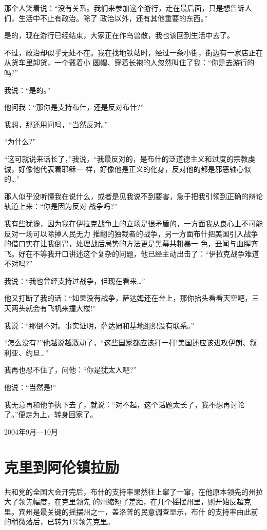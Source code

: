 ﻿\documentclass[11pt]{article}
\begin{document}
那个人笑着说：``没有关系。我们来参加这个游行，走在最后面，只是想告诉人们，生活中不止有政治。除了
政治以外，还有其他重要的东西。''


是的，现在游行已经结束，大家正在作鸟兽散，我也该回到生活中去了。

不过，政治却似乎无处不在。我在找地铁站时，经过一条小街，街边有一家店正在从货车里卸货，一个戴着小
圆帽、穿着长袍的人忽然叫住了我：``你是去游行的吗?''

我说：``是的。''

他问我：``那你是支持布什，还是反对布什?''

我想，那还用问吗，``当然反对。''

``为什么?''

``这可就说来话长了，''我说，``我最反对的，是布什的泛道德主义和过度的宗教虔诚，好像他代表着耶稣一
样，好像他是正义的化身，反对他的都是邪恶轴心似的\ldots ''

那人似乎没听懂我在说什么，或者是见我说不到要害，急于把我引领到正确的辩论轨道上来：``你是因为反对
战争吗?''

我有些犹豫，因为我在伊拉克战争上的立场是很矛盾的，一方面我从良心上不可能反对一场可以除掉人民无力
推翻的独裁者的战争，另一方面布什把美国引入战争的借口实在让我倒胃，处理战后局势的方法更是黑幕共粗暴一
色，丑闻与血腥齐飞。好在不等我开口讲述这个复杂的问题，他已经主动出击了：``伊拉克战争难道不对吗?''

我说：``我也曾经支持过战争，但现在看来\ldots ''

他又打断了我的话：``如果没有战争，萨达姆还在台上，那你抬头看看天空吧，三天两头就会有飞机来撞大楼!''

我说：``那倒不对。事实证明，萨达姆和基地组织没有联系。''

``怎么没有?''他越说越激动了，``这些国家都应该打一打!美国还应该进攻伊朗、叙利亚、约旦\ldots ''

我再也忍不住了，问他：``你是犹太人吧?''

他说：``当然是!''

我无意再和他争执下去了，就说：``对不起，这个话题太长了，我不想再讨论了。''便走为上，转身回家了。

2004年9月---10月

\section{克里到阿伦镇拉励}

共和党的全国大会开完后，布什的支持率果然往上窜了一窜，在他原本领先的州拉大了领先幅度，在克里领先
的州缩短了差距，在几个摇摆州里，则开始反超克里。宾州是最关键的摇摆州之一，盖洛普的民意调查显示，布什
的支持率由此前的稍微落后，已转为1\%领先克里。
\end{document}
